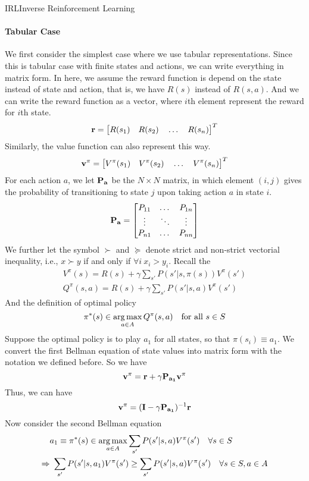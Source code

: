 \documentclass[9pt]{article}
\begin{document}
\begin{topic}{IRL}{Inverse Reinforcement Learning}
\paragraph{Tabular Case} We first consider the simplest case where we use tabular representations. Since this is tabular case with finite states and actions, we can write everything in matrix form. In here, we assume the reward function is depend on the state instead of state and action, that is, we have $R(s)$ instead of $R(s,a)$. And we can write the reward function as a vector, where $i$th element represent the reward for $i$th state.
\[
	\mathbf{r} = \big[R(s_1) \quad R(s_2) \quad \ldots \quad R(s_n)\big]^{T}
\]
Similarly, the value function can also represent this way.
\[
	\mathbf{v^\pi} =  \big[V^{\pi}(s_1) \quad V^{\pi}(s_2) \quad \ldots \quad V^{\pi}(s_n)\big]^{T}
\]
For each action $a$, we let $\mathbf{P_a}$ be the $N\times N$ matrix, in which element $(i,j)$ gives the probability of transitioning to state $j$ upon taking action $a$ in state $i$.
\[
\mathbf{P_a} = \begin{bmatrix} 
    P_{11} & \dots & P_{1n}\\
    \vdots & \ddots & \vdots\\
    P_{n1} &\dots   & P_{nn} 
    \end{bmatrix}
\]
We further let the symbol $\succ$ and $\succeq$ denote strict and non-strict vectorial inequality, i.e., $x\succ y$ if and only if $\forall i \  x_i > y_i$. Recall the 
\[
\begin{split}
V^{\pi}(s) = R(s) + \gamma \sum_{s'}P(s'|s,\pi(s))V^{\pi}(s')\\
Q^{\pi}(s,a) = R(s) + \gamma \sum_{s'}P(s'|s,a)V^{\pi}(s')
\end{split}
\]
And the definition of optimal policy
\[
	\pi^*(s) \in \operatorname*{arg\,max}_{a\in A}Q^{\pi}(s,a) \quad \text{for all } s \in S
\]
Suppose the optimal policy is to play $a_1$ for all states, so that $\pi(s_i)\equiv a_1$. We convert the first Bellman equation of state values into matrix form with the notation we defined before. So we have 
\[
\mathbf{v^{\pi}} = \mathbf{r} + \gamma\mathbf{P_{a_1}}\mathbf{v^{\pi}}
\]
Thus, we can have 
\[
\mathbf{v^{\pi}} = (\mathbf{I} - \gamma\mathbf{P_{a_1}})^{-1} \mathbf{r}
\]
Now consider the second Bellman equation
\[
\begin{split}
& a_1 \equiv \pi^*(s) \in \argmax_{a\in A} \sum_{s'} P(s'|s,a) V^{\pi}(s') \quad \forall s \in S\\
\Rightarrow &\ \sum_{s'} P(s'|s,a_1) V^{\pi}(s') \ge \sum_{s'} P(s'|s,a) V^{\pi}(s') \quad \forall s \in S, a\in A\\

\end{split}\]
\end{topic}
\end{document}
